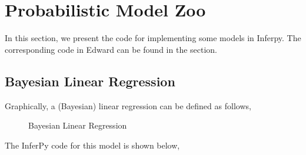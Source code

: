\documentclass[letterpaper,10pt,english]{sphinxmanual}
\begin{document}
\chapter{Probabilistic Model Zoo}
\label{\detokenize{notes/probzoo:probabilistic-model-zoo}}\label{\detokenize{notes/probzoo:proobzoo}}\label{\detokenize{notes/probzoo::doc}}
In this section, we present the code for implementing some models in Inferpy. The corresponding code
in Edward can be found in the   section.


\section{Bayesian Linear Regression}
\label{\detokenize{notes/probzoo:bayesian-linear-regression}}
Graphically, a (Bayesian) linear regression can be defined as follows,

\begin{figure}[htbp]
\centering
\capstart

\noindent{}
\caption{Bayesian Linear Regression}\label{\detokenize{notes/probzoo:id1}}\end{figure}

The InferPy code for this model is shown below,
\end{document}
